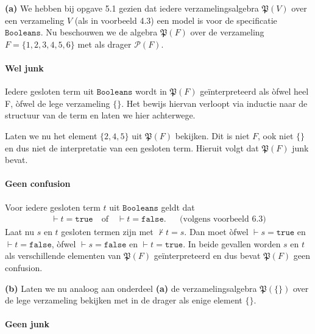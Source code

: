 \documentclass[a4paper,11pt]{article}
\begin{document}
\begin{description}

\item{\bf (a)} %
We hebben bij opgave 5.1 gezien dat iedere verzamelingsalgebra
$\mathfrak{P}(V)$ over een verzameling $V$ (als in voorbeeld 4.3) een model is
voor de specificatie $\texttt{Booleans}$. Nu beschouwen we de algebra
$\mathfrak{P}(F)$ over de verzameling $F=\{1,2,3,4,5,6\}$ met als drager
$\mathcal{P}(F)$.

\paragraph{Wel junk}

Iedere gesloten term uit $\texttt{Booleans}$ wordt in $\mathfrak{P}(F)$
ge\"interpreteerd als \`ofwel heel F, \`ofwel de lege verzameling $\{\}$. Het
bewijs hiervan verloopt via inductie naar de structuur van de term en laten we
hier achterwege.

Laten we nu het element $\{2,4,5\}$ uit $\mathfrak{P}(F)$ bekijken. Dit is
niet $F$, ook niet $\{\}$ en dus niet de interpretatie van een gesloten
term. Hieruit volgt dat $\mathfrak{P}(F)$ junk bevat.

\paragraph{Geen confusion}

Voor iedere gesloten term $t$ uit $\texttt{Booleans}$ geldt dat
\begin{align*}
\vdash t = \texttt{true} \quad \text{of} \quad \vdash t = \texttt{false}. &&\text{(volgens voorbeeld 6.3)}
\end{align*}
Laat nu $s$ en $t$ gesloten termen zijn met $\not \vdash t = s$. Dan moet
\`ofwel $\vdash s = \texttt{true}$ en $\vdash t = \texttt{false}$, \`ofwel
$\vdash s = \texttt{false}$ en $\vdash t = \texttt{true}$. In beide gevallen
worden $s$ en $t$ als verschillende elementen van $\mathfrak{P}(F)$
ge\"interpreteerd en dus bevat $\mathfrak{P}(F)$ geen confusion.

\item{\bf (b)} %
Laten we nu analoog aan onderdeel {\bf (a)} de verzamelingsalgebra
$\mathfrak{P}(\{\})$ over de lege verzameling bekijken met in de drager als
enige element $\{\}$.

\paragraph{Geen junk}


\end{description}
\end{document}

